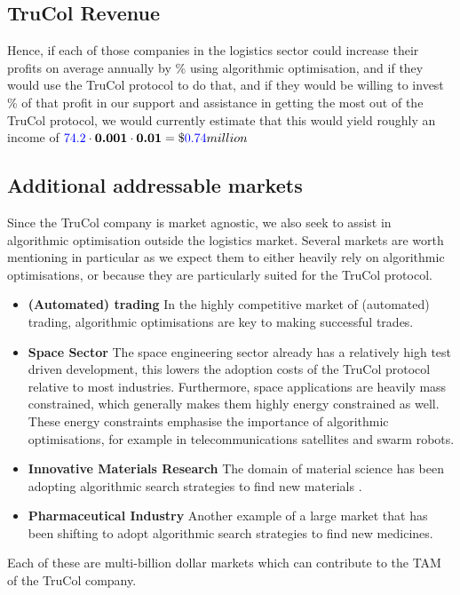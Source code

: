 

\subsection{TruCol Revenue}
Hence, if each of those companies in the logistics sector could increase their profits on average annually by \textbf{\avgalgooptimisationprofitpercentage}\% using algorithmic optimisation, and if they would use the TruCol protocol to do that, and if they would be willing to invest \textbf{\TruColcutonprofitpercentage}\% of that profit in our support and assistance in getting the most out of the TruCol protocol, we would currently estimate that this would yield roughly an income of $\textcolor{blue}{74.2}\cdot \textbf{0.001}\cdot \textbf{0.01}=\$\textcolor{blue}{0.74} million$

\subsection{Additional addressable markets}\label{subsubsec:additional_markets}
Since the TruCol company is market agnostic, we also seek to assist in algorithmic optimisation outside the logistics market. Several markets are worth mentioning in particular as we expect them to either heavily rely on algorithmic optimisations, or because they are particularly suited for the TruCol protocol.
\begin{itemize}
	\item \textbf{(Automated) trading} In the highly competitive market of (automated) trading, algorithmic optimisations are key to making successful trades.
	\item \textbf{Space Sector} The space engineering sector already has a relatively high test driven development\cite{todo}, this lowers the adoption costs of the TruCol protocol relative to most industries. Furthermore, space applications are heavily mass constrained, which generally makes them highly energy constrained as well. These energy constraints emphasise the importance of algorithmic optimisations, for example in telecommunications satellites and swarm robots.
	\item \textbf{Innovative Materials Research} The domain of material science has been adopting algorithmic search strategies to find new materials  \cite{allahyari2020coevolutionary}.
	\item \textbf{Pharmaceutical Industry} Another example of a large market that has been shifting to adopt algorithmic search strategies to find new medicines.
\end{itemize}
Each of these are multi-billion dollar markets which can contribute to the TAM of the TruCol company.
